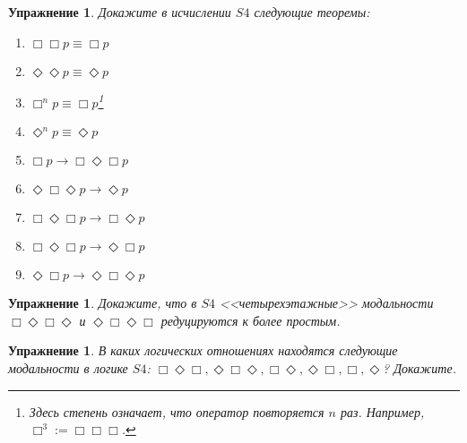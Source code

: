 \documentclass[11pt]{article}
\newtheorem{exercise}[theorem]{Упражнение}
\begin{document}
\begin{exercise}
Докажите в исчислении $S4$ следующие теоремы:
\begin{multicols}{3}
	\begin{enumerate}
		\item $\Box \Box p \equiv \Box p$
		\item $\Diamond \Diamond p \equiv \Diamond p$
		\item $\Box^n p \equiv \Box p$\footnote{Здесь степень означает, что оператор повторяется $n$ раз. Например, $\Box^3:= \Box \Box \Box$.}
		\item  $\Diamond^n p \equiv \Diamond p$
		\item $\Box p \to \Box \Diamond \Box p $
		\item $\Diamond \Box \Diamond p \to \Diamond p$
		\item $\Box \Diamond \Box p \to \Box \Diamond p$
	   \item $\Box \Diamond \Box p \to \Diamond \Box p$
		\item $\Diamond \Box p \to \Diamond \Box \Diamond p$
	\end{enumerate}
\end{multicols}
\end{exercise}

\begin{exercise}
	Докажите, что в $S4$ <<четырехэтажные>> модальности $\Box \Diamond \Box \Diamond$ и $\Diamond \Box \Diamond \Box$ редуцируются к более простым.
\end{exercise}

\begin{exercise}
	В каких логических отношениях находятся следующие модальности в логике $S4$: $\Box \Diamond \Box, \Diamond \Box \Diamond, \Box \Diamond, \Diamond \Box, \Box, \Diamond$? Докажите. 
\end{exercise}
\end{document}
